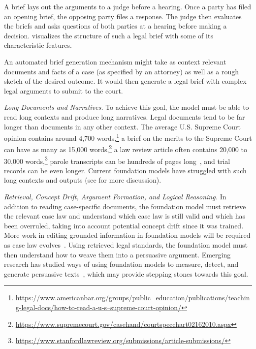 A brief lays out the arguments to a judge before a hearing. Once a party has filed an opening brief, the opposing party files a response. The judge then evaluates the briefs and asks questions of both parties at a hearing before making a decision.  visualizes the structure of such a legal brief with some of its characteristic features.

An automated brief generation mechanism might take as context relevant documents and facts of a case (as specified by an attorney) as well as a rough sketch of the desired outcome. It would then generate a legal brief with complex legal arguments to submit to the court. 
\medskip

\textit{Long Documents and Narratives.} To achieve this goal, the model must be able to read long contexts and produce long narratives.
Legal documents tend to be far longer than documents in any other context. The average U.S. Supreme Court opinion contains around 4,700 words,\footnote{\href{https://www.americanbar.org/groups/public\_education/publications/teaching-legal-docs/how-to-read-a-u-s--supreme-court-opinion/}{https://www.americanbar.org/groups/public\_education/publications/teaching-legal-docs/how-to-read-a-u-s--supreme-court-opinion/}} a brief on the merits to the Supreme Court can have as many as 15,000 words,\footnote{\href{https://www.supremecourt.gov/casehand/courtspecchart02162010.aspx}{https://www.supremecourt.gov/casehand/courtspecchart02162010.aspx}}
a law review article often contains 20,000 to 30,000 words,\footnote{\href{https://www.stanfordlawreview.org/submissions/article-submissions/}{https://www.stanfordlawreview.org/submissions/article-submissions/}}
parole transcripts can be hundreds of pages long~\citep{bell2021recon}, and trial records can be even longer.
Current foundation models have struggled with such long contexts and outputs (see  for more discussion).
\medskip

\textit{Retrieval, Concept Drift, Argument Formation, and Logical Reasoning.} In addition to reading case-specific documents, the foundation model must retrieve the relevant case law and understand which case law is still valid and which has been overruled, taking into account potential concept drift since it was trained. More work in editing grounded information in foundation models will be required as case law evolves~\citep{de2021editing}. Using retrieved legal standards, the foundation model must then understand how to weave them into a persuasive argument. Emerging research has studied ways of using foundation models to measure, detect, and generate persuasive texts~\citep{duerr2021persuasive, li-etal-2020-exploring,longpre-etal-2019-persuasion}, which may provide stepping stones towards this goal.

